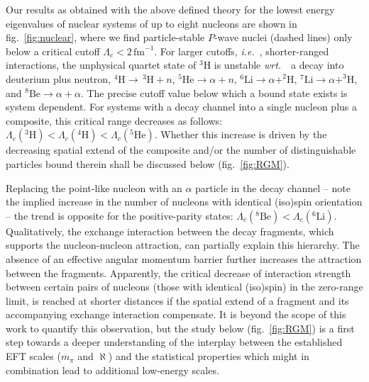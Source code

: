 \documentclass[preprint,12pt]{elsarticle}
\newcommand{\lc}{\ensuremath{\Lambda_c}}
\newcommand{\fm}{\ensuremath{\,\text{fm}^{-1}}}
\newcommand{\wrt}{\textit{wrt.}~}
\newcommand{\ie}{\textit{i.e.}~}
\begin{document}
Our results as obtained with the above defined theory
for the lowest energy eigenvalues of nuclear systems of up to eight nucleons are shown
in fig.~\ref{fig:nuclear},
where we find particle-stable $P$-wave nuclei (dashed lines) only below a critical cutoff $\lc<2\fm$.
For larger cutoffs, \ie, shorter-ranged interactions,
the unphysical quartet state of $^3$H is unstable \wrt~a decay into deuterium plus neutron, \mbox{$^4\text{H}\to\,^3\text{H} + n$},
\mbox{$^5\text{He}\to\alpha +n$}, \mbox{$^6\text{Li}\to\alpha+^2\text{H}$}, \mbox{$^7\text{Li}\to\alpha + ^3\text{H}$},
 and \mbox{$^8\text{Be}\to \alpha+\alpha$}.
The precise cutoff value below which a bound state exists is system dependent.
For systems with a decay channel into a single nucleon plus a composite, this critical range decreases as follows:
\mbox{$\lc(^3\text{H})<\lc(^4\text{H})<\lc(^5\text{He})$}. Whether this increase is driven by the decreasing spatial
 extend of the composite and/or
the number of distinguishable particles bound therein shall be discussed below (fig.~\ref{fig:RGM}).

Replacing the point-like nucleon with an $\alpha$ particle
in the decay channel -- note the implied increase in the number of nucleons with identical (iso)spin orientation -- the trend is opposite
for the positive-parity states: $\lc(^8\text{Be})<\lc(^6\text{Li})$.
Qualitatively, the exchange interaction between the decay fragments, which supports the nucleon-nucleon attraction,
can partially explain this hierarchy. The absence of an
effective angular momentum barrier further increases the attraction between the fragments. Apparently, the critical decrease
of interaction strength between certain pairs of nucleons (those with identical (iso)spin) in the zero-range limit, is reached
at shorter distances if the spatial extend of a fragment and its accompanying exchange interaction compensate.
It is beyond the scope of this work to quantify this observation, but the study below (fig.~\ref{fig:RGM}) is a first step
towards a deeper understanding of the interplay between the established EFT scales ($m_\pi$ and $\aleph$) and the statistical
properties which might in combination lead to additional low-energy scales. 
\end{document}
